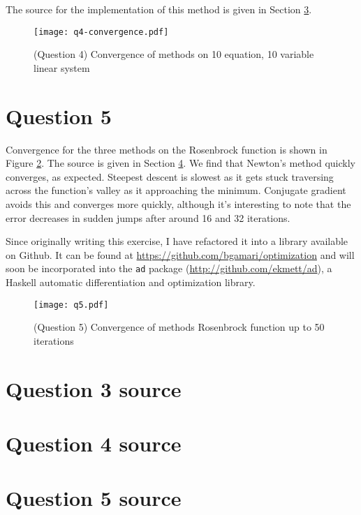\documentclass{article}
\begin{document}
The source for the implementation of this method is given in Section
\ref{Q4Source}.

\begin{figure}
  \center
  \texttt{[image: q4-convergence.pdf]}
  \caption{(Question 4) Convergence of methods on 10 equation, 10 variable linear system}
  \label{Fig:Q4Convergence}
\end{figure}

\section{Question 5}

Convergence for the three methods on the Rosenbrock function is shown
in Figure \ref{Fig:Q5Convergence}. The source is given in Section
\ref{Q5Source}. We find that Newton's method quickly converges, as
expected. Steepest descent is slowest as it gets stuck traversing
across the function's valley as it approaching the minimum. Conjugate
gradient avoids this and converges more quickly, although it's
interesting to note that the error decreases in sudden jumps after
around 16 and 32 iterations.

Since originally writing this exercise, I have refactored it into a
library available on Github. It can be found at
\url{https://github.com/bgamari/optimization} and will soon be
incorporated into the {\tt ad} package
(\url{http://github.com/ekmett/ad}), a Haskell automatic
differentiation and optimization library.

\begin{figure}
  \center
  \texttt{[image: q5.pdf]}
  \caption{(Question 5) Convergence of methods Rosenbrock function up to 50 iterations}
  \label{Fig:Q5Convergence}
\end{figure}

\appendix

\section{Question 3 source}\label{Q3Source}


\section{Question 4 source}\label{Q4Source}


\section{Question 5 source}\label{Q5Source}

\end{document}

